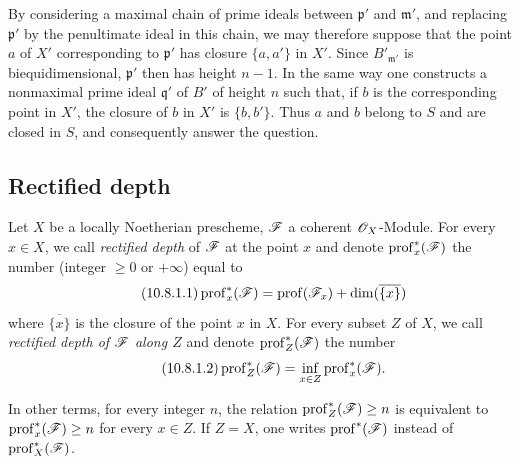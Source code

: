 \begin{env}[10.7.3]
By considering a maximal chain of prime ideals between $\mathfrak{p}'$ and $\mathfrak{m}'$, and replacing $\mathfrak{p}'$ by the penultimate ideal in this chain, we may therefore suppose that the point $a$ of $X'$ corresponding to $\mathfrak{p}'$ has closure $\{a,a'\}$ in $X'$.
Since $B'_{\mathfrak{m}'}$ is biequidimensional, $\mathfrak{p}'$ then has height $n-1$.
In the same way one constructs a nonmaximal prime ideal $\mathfrak{q}'$ of $B'$ of height $n$ such that, if $b$ is the corresponding point in $X'$, the closure of $b$ in $X'$ is $\{b,b'\}$.
Thus $a$ and $b$ belong to $S$ and are closed in $S$, and consequently answer the question.
\end{env}

\subsection{Rectified depth}
\label{subsection:IV.10.8}

\begin{definition}[10.8.1]
\label{IV.10.8.1}
Let $X$ be a locally Noetherian prescheme, $\mathscr{F}$ a coherent $\mathscr{O}_X$-Module.
For every $x\in X$, we call \emph{rectified depth} of $\mathscr{F}$ at the point $x$ and denote $\operatorname{prof}^*_x(\mathscr{F})$ the number (integer $\geq 0$ or $+\infty$) equal to
\begin{equation}
\label{IV.10.8.1.1}
\tag{10.8.1.1}
\operatorname{prof}^*_x(\mathscr{F})=\operatorname{prof}(\mathscr{F}_x)+\dim(\overline{\{x\}})
\end{equation}
where $\overline{\{x\}}$ is the closure of the point $x$ in $X$.
For every subset $Z$ of $X$, we call \emph{rectified depth of $\mathscr{F}$ along $Z$} and denote $\operatorname{prof}^*_Z(\mathscr{F})$ the number
\begin{equation}
\label{IV.10.8.1.2}
\tag{10.8.1.2}
\operatorname{prof}^*_Z(\mathscr{F})=\inf_{x\in Z}\operatorname{prof}^*_x(\mathscr{F}).
\end{equation}
\end{definition}

In other terms, for every integer $n$, the relation $\operatorname{prof}^*_Z(\mathscr{F})\geq n$ is equivalent to $\operatorname{prof}^*_x(\mathscr{F})\geq n$ for every $x\in Z$.
If $Z=X$, one writes $\operatorname{prof}^*(\mathscr{F})$ instead of $\operatorname{prof}^*_X(\mathscr{F})$.


